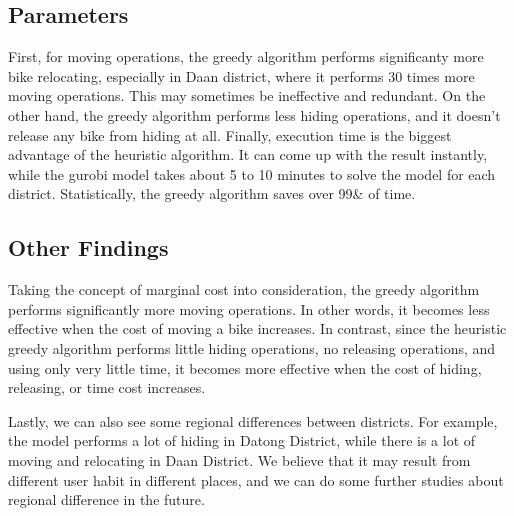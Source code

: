 \documentclass[11pt,a4paper]{article}
\begin{document}
\subsection*{Parameters}

First, for moving operations, the greedy algorithm performs significanty more bike relocating, especially in Daan district, where it performs 30 times more moving operations. This may sometimes be ineffective and redundant.
On the other hand, the greedy algorithm performs less hiding operations, and it doesn't release any bike from hiding at all.
Finally, execution time is the biggest advantage of the heuristic algorithm. It can come up with the result instantly, while the gurobi model takes about 5 to 10 minutes to solve the model for each district. Statistically, the greedy algorithm saves over 99& of time.

\subsection*{Other Findings}

Taking the concept of marginal cost into consideration, the greedy algorithm performs significantly more moving operations. In other words, it becomes less effective when the cost of moving a bike increases.
In contrast, since the heuristic greedy algorithm performs little hiding operations, no releasing operations, and using only very little time, it becomes more effective when the cost of hiding, releasing, or time cost increases.

Lastly, we can also see some regional differences between districts. For example, the model performs a lot of hiding in Datong District, while there is a lot of moving and relocating in Daan District. We believe that it may result from different user habit in different places, and we can do some further studies about regional difference in the future.


\vspace{0.5em}
\end{document}
